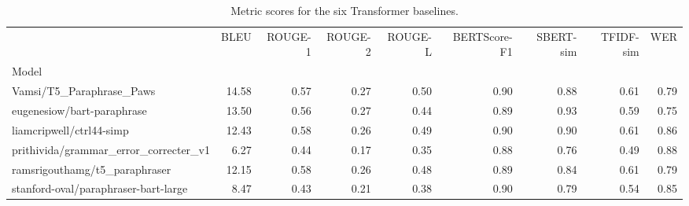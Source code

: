\begin{table}
\caption{Metric scores for the six Transformer baselines.}
\label{tab:sota-metrics}
\begin{tabular}{lrrrrrrrr}
\toprule
 & BLEU & ROUGE-1 & ROUGE-2 & ROUGE-L & BERTScore-F1 & SBERT-sim & TFIDF-sim & WER \\
Model &  &  &  &  &  &  &  &  \\
\midrule
Vamsi/T5_Paraphrase_Paws & 14.58 & 0.57 & 0.27 & 0.50 & 0.90 & 0.88 & 0.61 & 0.79 \\
eugenesiow/bart-paraphrase & 13.50 & 0.56 & 0.27 & 0.44 & 0.89 & 0.93 & 0.59 & 0.75 \\
liamcripwell/ctrl44-simp & 12.43 & 0.58 & 0.26 & 0.49 & 0.90 & 0.90 & 0.61 & 0.86 \\
prithivida/grammar_error_correcter_v1 & 6.27 & 0.44 & 0.17 & 0.35 & 0.88 & 0.76 & 0.49 & 0.88 \\
ramsrigouthamg/t5_paraphraser & 12.15 & 0.58 & 0.26 & 0.48 & 0.89 & 0.84 & 0.61 & 0.79 \\
stanford-oval/paraphraser-bart-large & 8.47 & 0.43 & 0.21 & 0.38 & 0.90 & 0.79 & 0.54 & 0.85 \\
\bottomrule
\end{tabular}
\end{table}
